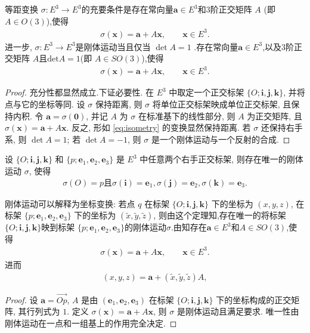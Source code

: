 \documentclass[../../main.tex]{subfiles}%
\begin{document}
\begin{theorem}\label{theorem:刚体运动等距变换的充要条件}
等距变换 $\sigma: E^3 \to E^3$的充要条件是存在常向量$\bm a\in E^3$和$3$阶正交矩阵 $A$ (即$A\in O(3)$),使得
\begin{align}
\sigma(\bm x) = \bm a + A\bm x, \qquad \bm x\in E^3. \label{eq:isometry}
\end{align}
进一步, $\sigma: E^3 \to E^3$是刚体运动当且仅当 $\det A = 1$ .存在常向量$\bm a\in E^3$,以及$3$阶正交矩阵 $A$且$\mathrm{det}A=1$(即 $A\in SO(3)$),使得
\begin{align*}
\sigma(\bm x) = \bm a + A\bm x, \qquad \bm x\in E^3.
\end{align*}
\end{theorem}
\begin{proof}
充分性都显然成立.下证必要性.
在 $E^3$ 中取定一个正交标架 $\{O;\bm i,\bm j,\bm k\}$, 并将点与它的坐标等同. 设 $\sigma$ 保持距离, 则 $\sigma$ 将单位正交标架映成单位正交标架, 且保持内积. 令 $\bm a = \sigma(\bm 0)$, 并记 $A$ 为 $\sigma$ 在标准基下的线性部分, 则 $A$ 为正交矩阵, 且 $\sigma(\bm x)=\bm a+A\bm x$. 反之, 形如 \eqref{eq:isometry} 的变换显然保持距离. 若 $\sigma$ 还保持右手系, 则 $\det A = 1$; 若 $\det A = -1$, 则 $\sigma$ 是一个刚体运动与一个反射的合成.
\end{proof}

\begin{theorem}
设 $\{O;\bm i,\bm j,\bm k\}$ 和 $\{p;\bm e_1,\bm e_2,\bm e_3\}$ 是 $E^3$ 中任意两个右手正交标架, 则存在唯一的刚体运动 $\sigma$, 使得
\begin{align*}
\sigma (O)=p\text{且}\sigma (\boldsymbol{i})=\boldsymbol{e}_1,\sigma (\boldsymbol{j})=\boldsymbol{e}_2,\sigma (\boldsymbol{k})=\boldsymbol{e}_3.
\end{align*}
\end{theorem}
\begin{remark}
刚体运动可以解释为坐标变换: 若点 $q$ 在标架 $\{O;\bm i,\bm j,\bm k\}$ 下的坐标为 $(x,y,z)$, 在标架 $\{p;\bm e_1,\bm e_2,\bm e_3\}$ 下的坐标为 $(\tilde x,\tilde y,\tilde z)$, 则由这个定理知,存在唯一的将标架 $\{O;\bm i,\bm j,\bm k\}$映到标架 $\{p;\bm e_1,\bm e_2,\bm e_3\}$的刚体运动$\sigma$.由知存在$\bm a\in E^3$和$A\in SO(3)$,使得
\begin{align*}
\sigma(\bm x) = \bm a + A\bm x, \qquad \bm x\in E^3.
\end{align*}
进而
\begin{align*}
(x,y,z) = \bm a + (\tilde x,\tilde y,\tilde z)A,
\end{align*}
\end{remark}
\begin{proof}
设 $\bm a = \overrightarrow{Op}$, $A$ 是由 $(\bm e_1,\bm e_2,\bm e_3)$ 在标架 $\{O;\bm i,\bm j,\bm k\}$ 下的坐标构成的正交矩阵, 其行列式为 $1$. 定义 $\sigma(\bm x)=\bm a + A\bm x$, 则 $\sigma$ 是刚体运动且满足要求. 唯一性由刚体运动在一点和一组基上的作用完全决定.
\end{proof}
\end{document}
